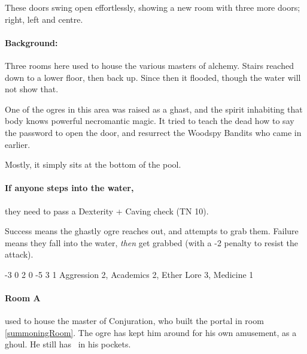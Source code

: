 \begin{multicols}{2}
\begin{enumerate}
\end{enumerate}


\begin{boxtext}
  These doors swing open effortlessly, showing a new room with three more doors; right, left and centre.

\end{boxtext}

\paragraph{Background:}
Three rooms here used to house the various masters of alchemy.
Stairs reached down to a lower floor, then back up.
Since then it flooded, though the water will not show that.

One of the ogres in this area was raised as a ghast, and the spirit inhabiting that body knows powerful necromantic magic.
It tried to teach the dead how to say the password to open the door, and resurrect the Woodspy Bandits who came in earlier.

Mostly, it simply sits at the bottom of the pool.

\paragraph{If anyone steps into the water,}
they need to pass a Dexterity + Caving check (TN 10).

Success means the ghastly ogre reaches out, and attempts to grab them.
Failure means they fall into the water, \emph{then} get grabbed (with a -2 penalty to resist the attack).

\label{undead_ogre}

  {-3}%
  {0}%
  {{2}%
  {0}%
  {-5}}%
  {3}%
  {1}%
  {Aggression 2, Academics 2, Ether Lore 3, Medicine 1
  \knacks{\nuraCaster}
  }%
  {\longsword}%
  {\addtocounter{xpbonus}{3}}

\paragraph{Room A} used to house the master of Conjuration, who built the portal in room \ref{summoningRoom}.
The ogre has kept him around for his own amusement, as a ghoul.
He still has \lootBig\ in his pockets.


\end{multicols}

